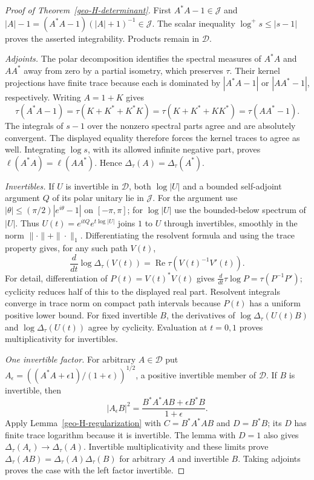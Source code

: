 \begin{proof}[Proof of Theorem~\ref{geo-H-determinant}]
First $A^*A-1\in\mathcal J$ and
$|A|-1=(A^*A-1)(|A|+1)^{-1}\in\mathcal J$.
The scalar inequality $\log^+s\leq|s-1|$ proves the asserted integrability.
Products remain in $\mathcal D$.

\emph{Adjoints.} The polar decomposition identifies the spectral measures
of $A^*A$ and $AA^*$ away from zero by a partial isometry, which preserves
$\tau$. Their kernel projections have finite trace because each is dominated
by $|A^*A-1|$ or $|AA^*-1|$, respectively. Writing $A=1+K$ gives
\[
 \tau(A^*A-1)=\tau(K+K^*+K^*K)
 =\tau(K+K^*+KK^*)=\tau(AA^*-1).
\]
The integrals of $s-1$ over the nonzero spectral parts agree and are
absolutely convergent. The displayed equality therefore forces the kernel
traces to agree as well. Integrating $\log s$, with its allowed infinite
negative part, proves $\ell(A^*A)=\ell(AA^*)$. Hence
$\Delta_\tau(A)=\Delta_\tau(A^*)$.

\emph{Invertibles.} If $U$ is invertible in $\mathcal D$, both
$\log|U|$ and a bounded self-adjoint argument $Q$ of its polar unitary lie
in $\mathcal J$. For the argument use
$|\theta|\leq(\pi/2)|e^{i\theta}-1|$ on $[-\pi,\pi]$; for
$\log|U|$ use the bounded-below spectrum of $|U|$. Thus
$U(t)=e^{itQ}e^{t\log|U|}$ joins $1$ to $U$ through invertibles, smoothly
in the norm $\|\cdot\|+\|\cdot\|_1$. Differentiating the resolvent formula
and using the trace property gives, for any such path $V(t)$,
\[
 \frac{d}{dt}\log\Delta_\tau(V(t))
  =\operatorname{Re}\tau(V(t)^{-1}V'(t)).
\]
For detail, differentiation of $P(t)=V(t)^*V(t)$ gives
$\frac d{dt}\tau\log P=\tau(P^{-1}P')$; cyclicity reduces half of this
to the displayed real part. Resolvent integrals converge in trace norm on
compact path intervals because $P(t)$ has a uniform positive lower bound.
For fixed invertible $B$, the derivatives of
$\log\Delta_\tau(U(t)B)$ and $\log\Delta_\tau(U(t))$ agree by cyclicity.
Evaluation at $t=0,1$ proves multiplicativity for invertibles.

\emph{One invertible factor.} For arbitrary $A\in\mathcal D$ put
$A_\epsilon=((A^*A+\epsilon1)/(1+\epsilon))^{1/2}$, a positive invertible
member of $\mathcal D$. If $B$ is invertible, then
\[
 |A_\epsilon B|^2
 =\frac{B^*A^*AB+\epsilon B^*B}{1+\epsilon}.
\]
Apply Lemma~\ref{geo-H-regularization} with $C=B^*A^*AB$ and $D=B^*B$;
its $D$ has finite trace logarithm because it is invertible. The lemma with
$D=1$ also gives $\Delta_\tau(A_\epsilon)\to\Delta_\tau(A)$.
Invertible multiplicativity and these limits prove
$\Delta_\tau(AB)=\Delta_\tau(A)\Delta_\tau(B)$ for arbitrary $A$ and
invertible $B$. Taking adjoints proves the case with the left factor
invertible.


\end{proof}
